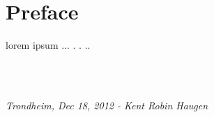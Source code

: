 \chapter*{Preface}

lorem ipsum ... . . .. 


\ \\ \\
\begin{center}
\emph{Trondheim, Dec 18, 2012 - Kent Robin Haugen}
\end{center}
\clearpage
